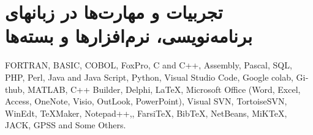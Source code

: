 \documentclass[11pt,a4paper]{bidimoderncv}
\begin{document}
\newpage 
\section{تجربیات و مهارت‌ها در زبانهای برنامه‌نویسی، نرم‌افزارها و بسته‌ها}
\begin{flushleft}
\begin{latin}
{FORTRAN, BASIC, COBOL, FoxPro, C and C++, Assembly, Pascal, SQL, PHP, Perl, Java and Java Script, Python, Visual Studio Code, Google colab, Github,
 MATLAB, C++ Builder, Delphi, \LaTeX, Microsoft Office (Word, Excel, Access, OneNote, Visio,
 OutLook, PowerPoint), Visual SVN, TortoiseSVN, WinEdt, TeXMaker, Notepad++,\XePersian, 
 Farsi\TeX, Bib\TeX, NetBeans, MiKTeX, JACK, GPSS and Some Others.}
\end{latin}
\end{flushleft}

\end{document}
